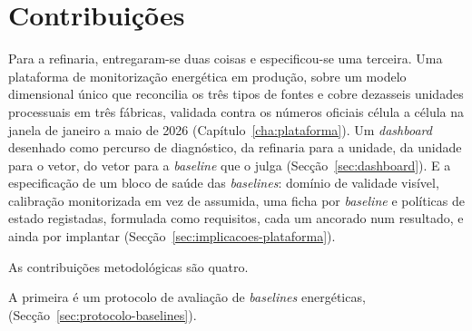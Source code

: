 


\section{Contribuições}
\label{sec:contribuicoes}


Para a refinaria, entregaram-se duas coisas e especificou-se uma
terceira. Uma plataforma de monitorização energética em produção, sobre
um modelo dimensional único que reconcilia os três tipos de fontes e cobre
dezasseis unidades processuais em três fábricas, validada contra os números oficiais célula a célula
na janela de janeiro a maio de 2026
(Capítulo~\ref{cha:plataforma}). Um
\emph{dashboard} desenhado como percurso de diagnóstico, da refinaria
para a unidade, da unidade para o vetor, do vetor para a \emph{baseline}
que o julga (Secção~\ref{sec:dashboard}). E a especificação de um bloco
de saúde das \emph{baselines}: domínio de
validade visível, calibração monitorizada em vez de assumida, uma ficha
por \emph{baseline} e políticas de estado registadas, formulada como
requisitos, cada um ancorado num resultado, e ainda por implantar
(Secção~\ref{sec:implicacoes-plataforma}).

As contribuições metodológicas são quatro.

A primeira é um protocolo de avaliação de \emph{baselines} energéticas,
(Secção~\ref{sec:protocolo-baselines}).

